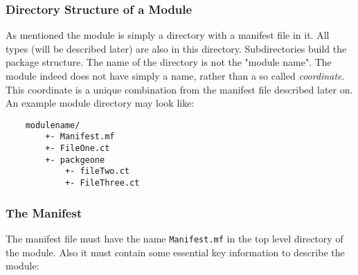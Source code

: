\documentclass[a4paper,12pt]{article}
\begin{document}
\subsubsection{Directory Structure of a Module}

As mentioned the module is simply a directory with a manifest file in it. All types (will be described later) are also in this directory. Subdirectories build the package structure. The name of the directory is not the "module name". The module indeed does not have simply a name, rather than a so called \textit{coordinate}. This coordinate is a unique combination from the manifest file described later on. An example module directory may look like:

\begin{verbatim}
    modulename/
        +- Manifest.mf
        +- FileOne.ct
        +- packgeone
            +- fileTwo.ct
            +- FileThree.ct
\end{verbatim}

\subsubsection{The Manifest}

The manifest file must have the name \verb|Manifest.mf| in the top level directory of the module. Also it must contain some essential key information to describe the module:
\end{document}

